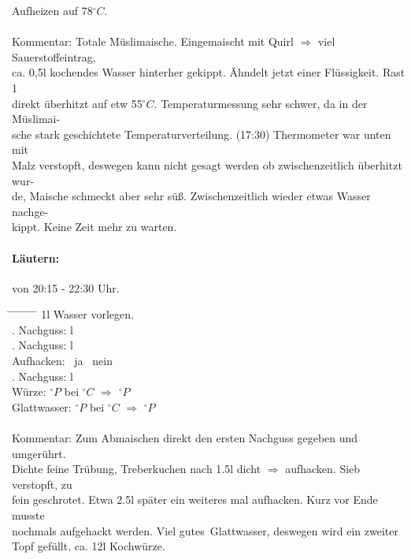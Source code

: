 \documentclass[12pt,oneside,a4paper]{scrartcl}
\begin{document}
{\begin{tabbing}
		\> \> Aufheizen auf 78$^\circ C$.\\\\
		\> Kommentar: \>\>\> Totale Müslimaische. Eingemaischt mit Quirl $\Rightarrow$ viel Sauerstoffeintrag,\\
		\> \> ca. 0,5l kochendes Wasser hinterher gekippt. Ähndelt jetzt einer Flüssigkeit. Rast 1\\ 
		\> \> direkt überhitzt auf etw 55$^\circ C$. Temperaturmessung sehr schwer, da in der Müslimai-\\
		\> \> sche stark geschichtete Temperaturverteilung. (17:30) Thermometer war unten mit \\
		\> \> Malz verstopft, deswegen kann nicht gesagt werden ob zwischenzeitlich überhitzt wur-\\
		\> \> de, Maische schmeckt aber sehr süß. Zwischenzeitlich wieder etwas Wasser nachge-\\
		\> \> kippt. Keine Zeit mehr zu warten.
	\end{tabbing}
%
\paragraph{Läutern:} von 20:15 - 22:30 Uhr.
	\begin{tabbing}
		\hspace{1cm} \= \hspace{1cm} \= \hspace{1cm} \= \hspace{1cm} \= \hspace{1cm} \=\hspace{1cm} \=\hspace{1cm} \=\hspace{1cm} \= \kill
		\> 1l Wasser vorlegen.\\
		\> . Nachguss: \> \> 4 l\\
		\> . Nachguss: \> \> 3 l\\
		\> \> \> Aufhacken: \> \> \Square \ ja \> \> \Square \ nein\\
		\> . Nachguss: \> \> 2 l\\
		\> Würze: \> \> $^\circ P$ \> bei $^\circ C$ \> $\Rightarrow$ $^\circ P$\\
		\> Glattwasser: \> \> $^\circ P$ \> bei $^\circ C$ \> $\Rightarrow$ $^\circ P$\\\\
		\> Kommentar: \>\>\> Zum Abmaischen direkt den ersten Nachguss gegeben und umgerührt.\\
		\> \> Dichte feine Trübung, Treberkuchen nach 1.5l dicht $\Rightarrow$ aufhacken. Sieb verstopft, zu\\
		\> \> fein geschrotet. Etwa 2.5l später ein weiteres mal aufhacken. Kurz vor Ende musste \\
		\> \> nochmals aufgehackt werden. Viel \glqq gutes\grqq\ Glattwasser, deswegen wird ein zweiter \\
		\> \> Topf gefüllt. ca. 12l Kochwürze.
	\end{tabbing}
%
}
\end{document}
